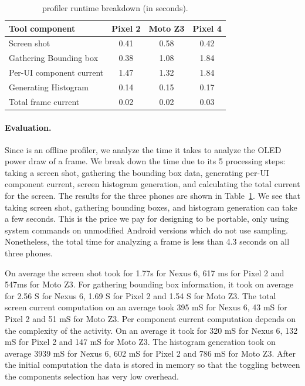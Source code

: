 \begin{table}[tp]
\begin{center}
	\centering
	\caption{\name profiler runtime breakdown (in seconds).}
	\label{tab:tooloverhead}
        \vspace{-0.1in}
    {\footnotesize
    \begin{tabular}{ | l | c | c | c | }
		\hline
		Tool component        	&  Pixel 2 & Moto Z3 & Pixel 4\\
		\hline
		Screen shot	        	&  0.41 & 0.58 & 0.42 \\
		Gathering Bounding box  &  0.38 & 1.08 & 1.84 \\
		Per-UI component current	&  1.47 & 1.32 & 1.84 \\
		Generating Histogram	&  0.14 & 0.15 & 0.17 \\  
		Total frame current     &  0.02 & 0.02 & 0.03 \\
		\hline
	\end{tabular}
	}
\end{center}
\vspace{-0.15in}
\end{table}

\paragraph{Evaluation.}
Since \name is an offline profiler,
we analyze the time it takes to analyze the OLED power draw of a frame.
We break down the time due
to its 5 processing steps: taking a screen shot, gathering the bounding box
data, generating per-UI component current, screen histogram generation,
and calculating the total current for the screen.  The results for the
three phones are shown in Table~\ref{tab:tooloverhead}.  We see that
taking screen shot, gathering bounding boxes, and histogram generation can
take a few seconds. This is the price we pay
for designing \name to be portable, \ie  only using system
commands on unmodified Android versions which do not use sampling.
Nonetheless, the total time for analyzing a frame is less than 4.3
seconds on all three phones.



On average the screen shot took for 1.77s for Nexus 6, 617
ms for Pixel 2 and 547ms for Moto Z3.  For gathering bounding box
information, it took on average for 2.56 S for Nexus 6, 1.69 S for
Pixel 2 and 1.54 S for Moto Z3.  The total screen current computation
on an average took 395 mS for Nexus 6, 43 mS for Pixel 2 and 51 mS for
Moto Z3.  Per component current computation depends on the complexity
of the activity. On an average it took for 320 mS for Nexus 6, 132 mS
for Pixel 2 and 147 mS for Moto Z3.  The histogram generation took on
average 3939 mS for Nexus 6, 602 mS for Pixel 2 and 786 mS for Moto
Z3.  After the initial computation the data is stored in memory so
that the toggling between the components selection has very low
overhead.
\fi

